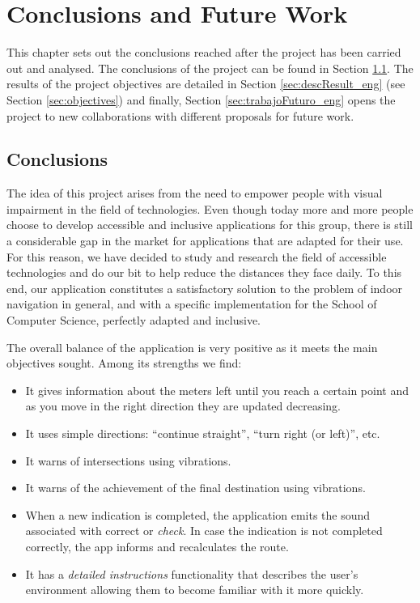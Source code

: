 \chapter{Conclusions and Future Work}
\label{cap:conclusions}

This chapter sets out the conclusions reached after the project has been carried out and analysed. The conclusions of the project can be found in Section \ref{sec:concluFinales_eng}. The results of the project objectives are detailed in Section \ref{sec:descResult_eng} (see Section \ref{sec:objectives}) and finally, Section \ref{sec:trabajoFuturo_eng} opens the project to new collaborations with different proposals for future work.


\section{Conclusions}
\label{sec:concluFinales_eng}

The idea of this project arises from the need to empower people with visual impairment in the field of technologies. Even though today more and more people choose to develop accessible and inclusive applications for this group, there is still a considerable gap in the market for applications that are adapted for their use. For this reason, we have decided to study and research the field of accessible technologies and do our bit to help reduce the distances they face daily. To this end, our application constitutes a satisfactory solution to the problem of indoor navigation in general, and with a specific implementation for the School of Computer Science, perfectly adapted and inclusive.

The overall balance of the application is very positive as it meets the main objectives sought. Among its strengths we find:

\begin{itemize}
	\item It gives information about the meters left until you reach a certain point and as you move in the right direction they are updated decreasing.
	\item It uses simple directions: ``continue straight'', ``turn right (or left)'', etc.
	\item It warns of intersections using vibrations.
	\item It warns of the achievement of the final destination using vibrations.
	\item When a new indication is completed, the application emits the sound associated with correct or \textit{check}. In case the indication is not completed correctly, the app informs and recalculates the route.
	\item It has a \textit{detailed instructions} functionality that describes the user's environment allowing them to become familiar with it more quickly.
\end{itemize}



